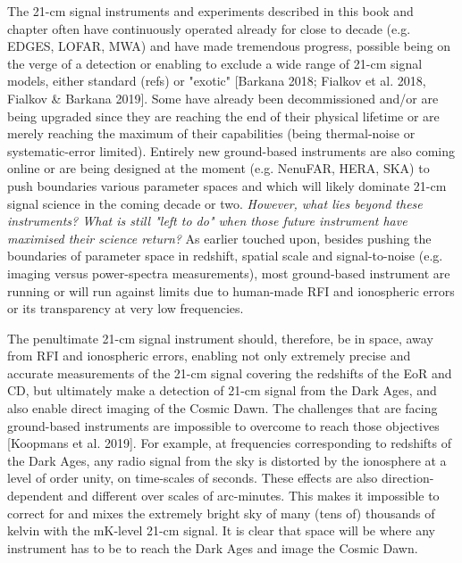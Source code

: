 The 21-cm signal instruments and experiments described in this book and chapter often have continuously operated already for close to decade (e.g. EDGES, LOFAR, MWA) and have made tremendous progress, possible being on the verge of a detection or enabling to exclude a wide range of 21-cm signal models, either standard (refs) or "exotic" [Barkana 2018; Fialkov et al. 2018, Fialkov \& Barkana 2019]. Some have already been decommissioned and/or are being upgraded since they are reaching the end of their physical lifetime or are merely reaching the maximum of their capabilities (being thermal-noise or systematic-error limited). Entirely new ground-based instruments are also coming online or are being designed at the moment (e.g. NenuFAR, HERA, SKA) to push boundaries various parameter spaces and which will likely dominate 21-cm signal science in the coming decade or two. {\sl However, what lies beyond these instruments? What is still "left to do" when those future instrument have maximised their science return?} As earlier touched upon, besides pushing the boundaries of parameter space in redshift, spatial scale and signal-to-noise (e.g. imaging versus power-spectra measurements), most ground-based instrument are running or will run against limits due to human-made RFI and ionospheric errors or its transparency at very low frequencies. 

The penultimate 21-cm signal instrument should, therefore, be in space, away from RFI and ionospheric errors, enabling not only extremely precise and accurate measurements of the 21-cm signal covering the redshifts of the EoR and CD, but ultimately make a detection of 21-cm signal from the Dark Ages, and also enable direct imaging of the Cosmic Dawn. The challenges that are facing ground-based instruments are impossible to overcome to reach those objectives [Koopmans et al. 2019]. For example, at frequencies corresponding to redshifts of the Dark Ages, any radio signal from the sky is distorted by the ionosphere at a level of order unity, on time-scales of seconds. These effects are also direction-dependent and different over scales of arc-minutes. This makes it impossible to correct for and mixes the extremely bright sky of many (tens of) thousands of kelvin with the mK-level 21-cm signal. It is clear that space will be where any instrument has to be to reach the Dark Ages and image the Cosmic Dawn.


